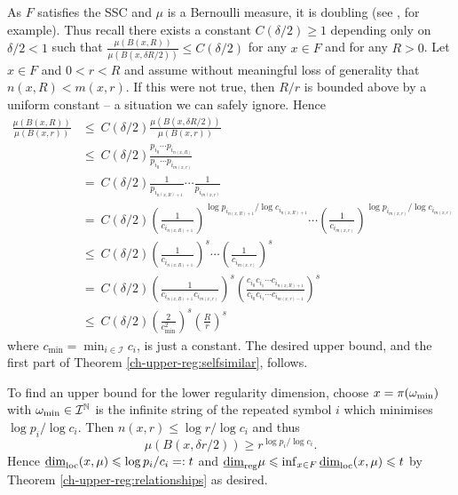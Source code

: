 As $F$ satisfies the SSC and $\mu$ is a Bernoulli measure, it is doubling (see \cite{olsenformalism}, for example). Thus recall there exists a constant $C(\delta/2) \geq 1$ depending only on $\delta/2 < 1$ such that $\frac{\mu(B(x, R))}{\mu(B(x,\delta R/2))}\le C(\delta/2)$ for any $x\in F$ and for any $R>0$.  Let $x \in F$ and $0<r<R$  and assume without meaningful loss of generality that $n(x,R) < m(x,r)$. If this were not true, then $R/r$ is bounded above by a uniform constant -- a situation we can safely ignore.  Hence
\begin{align*}
\frac{\mu(B(x,R))}{\mu (B(x,r))}& \le \ C(\delta/2) \frac{\mu(B(x,\delta R/2))}{\mu (B(x,r))}  \\
& \le \ C(\delta/2) \frac{p_{i_0}\cdots p_{i_{n(x,R)}}}{p_{i_0}\cdots p_{i_{m(x,r)}}} \\
& =\  C(\delta/2)  \frac{1}{p_{i_{n(x,R)+1}}} \cdots \frac{1}{p_{i_{m(x,r)}}} \\
& = \ C(\delta/2)  \left(\frac{1}{c_{i_{n(x,R)+1}}}\right)^{\log p_{i_{n(x,R)+1}}/\log c_{i_{n(x,R)+1}}} \cdots \left(\frac{1}{c_{i_{m(x,r)}}}\right)^{\log p_{i_{m(x,r)}}/\log c_{i_{m(x,r)}}} \\
& \le\  C(\delta/2)  \left( \frac{1}{c_{i_{n(x,R)+1}}}\right)^s \cdots \left( \frac{1}{c_{i_{m(x,r)}}}\right)^s \\
& = \ C(\delta/2)  \left(\frac{1}{c_{i_{n(x,R)+1}} c_{i_{m(x,r)}}}\right)^s \left( \frac{c_{i_0}c_{i_1} \cdots c_{i_{n(x,R)+1}}}{c_{i_0}c_{i_1} \cdots c_{i_{m(x,r)-1}}}\right)^s \\
& \le \  C(\delta/2)   \left(\frac{2}{c_{\min}^2}\right)^s \left( \frac{R}{r}\right)^s
\end{align*}
where $c_{\min} = \min_{i\in \mathcal{I}}c_i$, is just a constant. The desired upper bound, and the first part of Theorem \ref{ch-upper-reg:selfsimilar}, follows.


To find an upper bound for the lower regularity dimension, choose $x = \pi (\omega_\textup{min})$ with $\omega_\textup{min} \in \mathcal{I}^{\mathbb{N}}$ is the infinite string of the repeated symbol $i$ which minimises $\log p_i / \log c_i$. Then $n(x,r) \le  \log r / \log c_i$ and thus
\[
\mu(B(x,\delta r / 2)) \ge r^{\log p_i / \log c_i}.
\]
Hence $\underline{\dim}_{\textup{loc}}(x,\mu) \leqslant \log p_i/c_i =: t$ and $\underline{\dim}_{\textup{reg}} \mu \leqslant \inf_{x\in F} \underline{\dim}_{\textup{loc}}(x,\mu) \leqslant t$ by Theorem \ref{ch-upper-reg:relationships} as desired.

